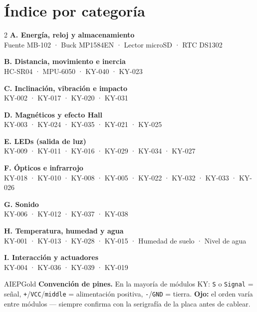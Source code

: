 \documentclass[10pt,letterpaper]{article}
\begin{document}
\section{Índice por categoría}
\begin{multicols}{2}
\footnotesize
\textbf{\textcolor{AIEPNavy}{A. Energía, reloj y almacenamiento}}\\
Fuente MB-102 · Buck MP1584EN · Lector microSD · RTC DS1302\par
\textbf{\textcolor{AIEPNavy}{B. Distancia, movimiento e inercia}}\\
HC-SR04 · MPU-6050 · KY-040 · KY-023\par
\textbf{\textcolor{AIEPNavy}{C. Inclinación, vibración e impacto}}\\
KY-002 · KY-017 · KY-020 · KY-031\par
\textbf{\textcolor{AIEPNavy}{D. Magnéticos y efecto Hall}}\\
KY-003 · KY-024 · KY-035 · KY-021 · KY-025\par
\textbf{\textcolor{AIEPNavy}{E. LEDs (salida de luz)}}\\
KY-009 · KY-011 · KY-016 · KY-029 · KY-034 · KY-027\par
\textbf{\textcolor{AIEPNavy}{F. Ópticos e infrarrojo}}\\
KY-018 · KY-010 · KY-008 · KY-005 · KY-022 · KY-032 · KY-033 · KY-026\par
\textbf{\textcolor{AIEPNavy}{G. Sonido}}\\
KY-006 · KY-012 · KY-037 · KY-038\par
\textbf{\textcolor{AIEPNavy}{H. Temperatura, humedad y agua}}\\
KY-001 · KY-013 · KY-028 · KY-015 · Humedad de suelo · Nivel de agua\par
\textbf{\textcolor{AIEPNavy}{I. Interacción y actuadores}}\\
KY-004 · KY-036 · KY-039 · KY-019\par
\end{multicols}

\begin{infobox}{AIEPGold}
\textbf{Convención de pines.} En la mayoría de módulos KY: \texttt{S} o \texttt{Signal} = señal,
\texttt{+}/\texttt{VCC}/\texttt{middle} = alimentación positiva, \texttt{-}/\texttt{GND} = tierra.
\textbf{Ojo:} el orden varía entre módulos — siempre confirma con la serigrafía de la placa antes de cablear.
\end{infobox}

\end{document}
